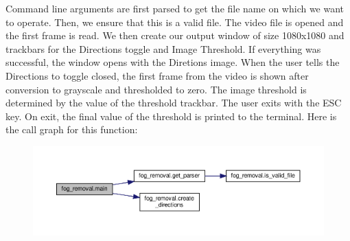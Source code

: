 Command line arguments are first parsed to get the file name on which we want to operate. Then, we ensure that this is a valid file. The video file is opened and the first frame is read. We then create our output window of size 1080x1080 and trackbars for the Directions toggle and Image Threshold. If everything was successful, the window opens with the Diretions image. When the user tells the Directions to toggle closed, the first frame from the video is shown after conversion to grayscale and thresholded to zero. The image threshold is determined by the value of the threshold trackbar. The user exits with the E\+SC key. On exit, the final value of the threshold is printed to the terminal. Here is the call graph for this function\+:\nopagebreak
\begin{figure}[H]
\begin{center}
\leavevmode
\includegraphics[width=350pt]{namespacefog__removal_a427a577da8405e5624962d7ef722aadf_cgraph}
\end{center}
\end{figure}

